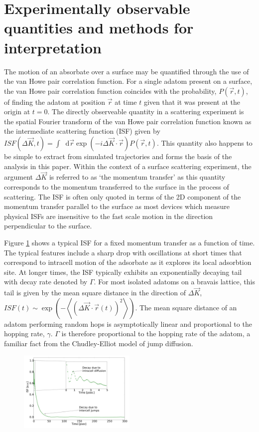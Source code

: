 \documentclass{article}
\newcommand*{\diff}{\mathop{}\!\mathrm{d}}
\begin{document}
\section{Experimentally observable quantities and methods for interpretation}

The motion of an absorbate over a surface may be quantified through the use of the van Howe pair correlation function. For a single adatom present on a surface, the van Howe pair correlation function coincides with the probability, $P\left(\vec{r},t\right)$, of finding the adatom at position $\vec{r}$ at time $t$ given that it was present at the origin at $t=0$. The directly observeable quantity in a scattering experiment is the spatial Fourier transform of the van Howe pair correlation function known as the intermediate scattering function (ISF) given by $ISF\left(\Delta{\vec{K}}, t\right) = \int \diff{\vec{r}} \exp\left(-i\Delta{\vec{K}}\cdot\vec{r}\right)P(\vec{r}, t)$. This quantity also happens to be simple to extract from simulated trajectories and forms the basis of the analysis in this paper. Within the context of a surface scattering experiment, the argument $\Delta{\vec{K}}$ is referred to as `the momentum transfer' as this quantity corresponds to the momentum transferred to the surface in the process of scattering. The ISF is often only quoted in terms of the 2D component of the momentum transfer parallel to the surface as most devices which measure physical ISFs are insensitive to the fast scale motion in the direction perpendicular to the surface.

Figure \ref{fig:isf_example} shows a typical ISF for a fixed momentum transfer as a function of time. The typical features include a sharp drop with oscillations at short times that correspond to intracell motion of the adsorbate as it explores its local adsorbtion site. At longer times, the ISF typically exhibits an exponentially decaying tail with decay rate denoted by $\Gamma$. For most isolated adatoms on a bravais lattice, this tail is given by the mean square distance in the direction of $\Delta{\vec{K}}$, $ISF(t) \sim \exp\left(- \left<\left(\Delta{\vec{K}}\cdot\vec{r}(t)\right)^2\right>\right)$. The mean square distance of an adatom performing random hops is asymptotically linear and proportional to the hopping rate, $\gamma$. $\Gamma$ is therefore proportional to the hopping rate of the adatom, a familiar fact from the Chudley-Elliot model of jump diffusion.

\begin{figure}
	\centering
	\includegraphics[width=0.5\textwidth]{isf_example}
	\caption{}
	\label{fig:isf_example}
\end{figure}
\end{document}
